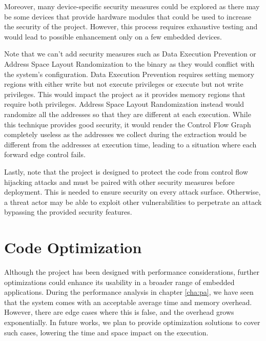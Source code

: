 Moreover, many device-specific security measures could be explored as there may
be some devices that provide hardware modules that could be used to increase the
security of the project. However, this process requires exhaustive testing and
would lead to possible enhancement only on a few embedded devices.

Note that we can't add security measures such as Data Execution Prevention or
Address Space Layout Randomization to the binary as they would conflict with the
system's configuration. Data Execution Prevention requires setting memory regions
with either write but not execute privileges or execute but not write privileges.
This would impact the project as it provides memory regions that require both
privileges. Address Space Layout Randomization instead would randomize all the addresses
so that they are different at each execution. While this technique provides good
security, it would render the Control Flow Graph completely useless as the addresses
we collect during the extraction would be different from the addresses at execution
time, leading to a situation where each forward edge control fails.

Lastly, note that the project is designed to protect the code from control flow hijacking
attacks and must be paired with other security measures before deployment. This
is needed to ensure security on every attack surface. Otherwise, a threat actor
may be able to exploit other vulnerabilities to perpetrate an attack bypassing
the provided security features.

\section{Code Optimization}
\label{sec:future_optimization}

Although the project has been designed with performance considerations, further
optimizations could enhance its usability in a broader range of embedded
applications. During the performance analysis in chapter \ref{cha:pa}, we have
seen that the system comes with an acceptable average time and memory overhead. However,
there are edge cases where this is false, and the overhead grows exponentially.
In future works, we plan to provide optimization solutions to cover such cases,
lowering the time and space impact on the execution.

